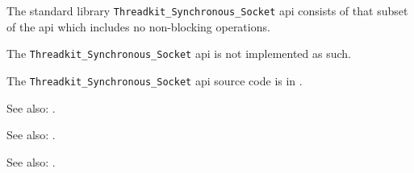 
The standard library {\tt Threadkit\_Synchronous\_Socket} api consists of that subset of the 
 api which includes no non-blocking operations.

The {\tt Threadkit\_Synchronous\_Socket} api is not implemented as such.

The {\tt Threadkit\_Synchronous\_Socket} api source code is in .

See also:  .

See also:  .

See also:  .
